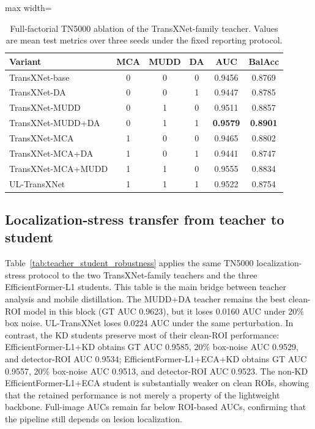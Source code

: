 \documentclass[preprint,12pt]{elsarticle}
\begin{document}
\begin{table}[!htbp]
    \centering
    \small
    \caption{Full-factorial TN5000 ablation of the TransXNet-family teacher. Values are mean test metrics over three seeds under the fixed reporting protocol.}
    \label{tab:factorial}
    \begin{adjustbox}{max width=\columnwidth}
    \begin{tabular}{lccccc}
        \toprule
        Variant & MCA & MUDD & DA & AUC & BalAcc \\
        \midrule
        TransXNet-base & 0 & 0 & 0 & 0.9456 & 0.8769 \\
        TransXNet-DA & 0 & 0 & 1 & 0.9447 & 0.8785 \\
        TransXNet-MUDD & 0 & 1 & 0 & 0.9511 & 0.8857 \\
        TransXNet-MUDD+DA & 0 & 1 & 1 & \textbf{0.9579} & \textbf{0.8901} \\
        TransXNet-MCA & 1 & 0 & 0 & 0.9465 & 0.8802 \\
        TransXNet-MCA+DA & 1 & 0 & 1 & 0.9441 & 0.8747 \\
        TransXNet-MCA+MUDD & 1 & 1 & 0 & 0.9555 & 0.8834 \\
        UL-TransXNet & 1 & 1 & 1 & 0.9522 & 0.8754 \\
        \bottomrule
    \end{tabular}
    \end{adjustbox}
\end{table}

\subsection{Localization-stress transfer from teacher to student}

Table~\ref{tab:teacher_student_robustness} applies the same TN5000 localization-stress protocol to the two TransXNet-family teachers and the three EfficientFormer-L1 students. This table is the main bridge between teacher analysis and mobile distillation. The MUDD+DA teacher remains the best clean-ROI model in this block (GT AUC 0.9623), but it loses 0.0160 AUC under 20\% box noise. UL-TransXNet loses 0.0224 AUC under the same perturbation. In contrast, the KD students preserve most of their clean-ROI performance: EfficientFormer-L1+KD obtains GT AUC 0.9585, 20\% box-noise AUC 0.9529, and detector-ROI AUC 0.9534; EfficientFormer-L1+ECA+KD obtains GT AUC 0.9557, 20\% box-noise AUC 0.9513, and detector-ROI AUC 0.9523. The non-KD EfficientFormer-L1+ECA student is substantially weaker on clean ROIs, showing that the retained performance is not merely a property of the lightweight backbone. Full-image AUCs remain far below ROI-based AUCs, confirming that the pipeline still depends on lesion localization.
\end{document}
